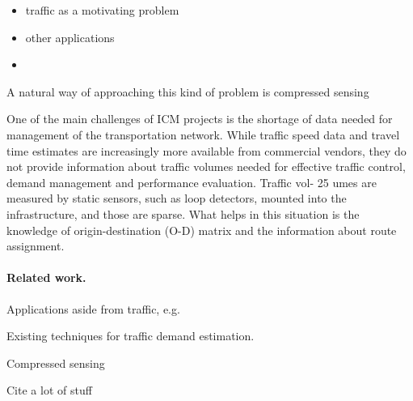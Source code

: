 \documentclass{article} %
\begin{document}
\begin{itemize}
\item traffic as a motivating problem
\item other applications
\item 
\end{itemize}

A natural way of approaching this kind of problem is compressed sensing

One of the main challenges of ICM projects is the shortage of data needed for management
of the transportation network. While traffic speed data and travel time estimates are increasingly more available from commercial vendors, they do not provide information about traffic volumes needed for effective traffic control, demand management and performance evaluation. Traffic vol-
25 umes are measured by static sensors, such as loop detectors, mounted into the infrastructure, and those are sparse. What helps in this situation is the knowledge of origin-destination (O-D) matrix and the information about route assignment.


\paragraph{Related work.}
Applications aside from traffic, e.g.

Existing techniques for traffic demand estimation.

Compressed sensing

Cite a lot of stuff
\end{document}
